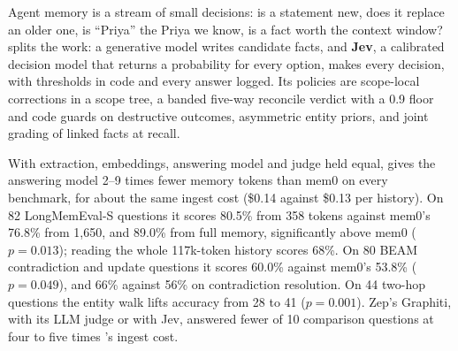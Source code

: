 Agent memory is a stream of small decisions: is a statement new, does it replace an older one, is ``Priya'' the Priya we
know, is a fact worth the context window? \textbf{\mx} splits the work: a generative model writes candidate facts, and
\textbf{Jev}, a calibrated decision model that returns a probability for every option, makes every decision, with
thresholds in code and every answer logged. Its policies are scope-local corrections in a scope tree, a banded
five-way reconcile verdict with a 0.9 floor and code guards on destructive outcomes, asymmetric entity priors, and joint
grading of linked facts at recall.

With extraction, embeddings, answering model and judge held equal, \mx{} gives the answering model 2--9 times fewer
memory tokens than mem0 on every benchmark, for about the same ingest cost (\$0.14 against \$0.13 per history). On 82
LongMemEval-S questions it scores 80.5\% from 358 tokens against mem0's 76.8\% from 1,650, and 89.0\% from full memory,
significantly above mem0 ($p=0.013$); reading the whole 117k-token history scores 68\%. On 80 BEAM contradiction and
update questions it scores 60.0\% against mem0's 53.8\% ($p=0.049$), and 66\% against 56\% on contradiction resolution.
On 44 two-hop questions the entity walk lifts accuracy from 28 to 41 ($p=0.001$). Zep's Graphiti, with its LLM judge or
with Jev, answered fewer of 10 comparison questions at four to five times \mx{}'s ingest cost.
